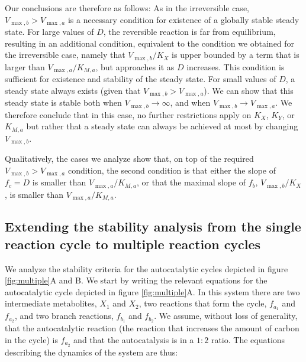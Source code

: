 Our conclusions are therefore as follows:
As in the irreversible case, $V_{\max,b}>V_{\max,a}$ is a necessary condition for existence of a globally stable steady state.
For large values of $D$, the reversible reaction is far from equilibrium, resulting in an additional condition, equivalent to the condition we obtained for the irreversible case, namely that $V_{\max,b}/K_X$ is upper bounded by a term that is larger than $V_{\max,a}/K_{M,a}$, but approaches it as $D$ increases.
This condition is sufficient for existence and stability of the steady state.
For small values of $D$, a steady state always exists (given that $V_{\max,b}>V_{\max,a}$).
We can show that this steady state is stable both when $V_{\max,b}\rightarrow \infty$, and when $V_{\max,b}\rightarrow V_{\max,a}$.
We therefore conclude that in this case, no further restrictions apply on $K_X$, $K_Y$, or $K_{M,a}$ but rather that a steady state can always be achieved at most by changing $V_{\max,b}$.

Qualitatively, the cases we analyze show that, on top of the required $V_{\max,b}>V_{\max,a}$ condition, the second condition is that either the slope of $f_c=D$ is smaller than $V_{\max,a}/K_{M,a}$, or that the maximal slope of $f_b$, $V_{\max,b}/K_X$, is smaller than $V_{\max,a}/K_{M,a}$.
\subsection{Extending the stability analysis from the single reaction cycle to multiple reaction cycles}
    We analyze the stability criteria for the autocatalytic cycles depicted in figure \ref{fig:multiple}A and B.
    We start by writing the relevant equations for the autocatalytic cycle depicted in figure \ref{fig:multiple}A.
    In this system there are two intermediate metabolites, $X_1$ and $X_2$, two reactions that form the cycle, $f_{a_1}$ and $f_{a_2}$, and two branch reactions, $f_{b_1}$ and $f_{b_2}$.
    We assume, without loss of generality, that the autocatalytic reaction (the reaction that increases the amount of carbon in the cycle) is $f_{a_2}$ and that the autocatalysis is in a $1\mathbin{:}2$ ratio.
    The equations describing the dynamics of the system are thus:


